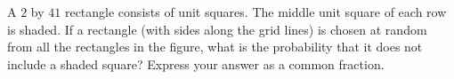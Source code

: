 A $2$ by $41$ rectangle consists of unit squares. The middle unit square of each row is shaded. If a rectangle (with sides along the grid lines) is chosen at random from all the rectangles in the figure, what is the probability that it does not include a shaded square? Express your answer as a common fraction.
